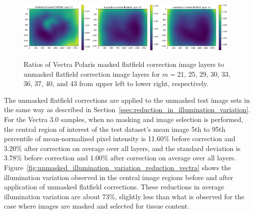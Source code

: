 \documentclass[letterpaper,11pt]{article}
\newcommand{\reffig}[1]{Figure~\ref{#1}}
\newcommand{\refsec}[1]{Section~\ref{#1}}
\begin{document}
\begin{figure}[!ht]
\includegraphics[width=0.32\textwidth]{images/results/masked_over_unmasked_flatfield_image_layers_polaris/masked_over_unmasked_flatfield_layer_37}
\includegraphics[width=0.32\textwidth]{images/results/masked_over_unmasked_flatfield_image_layers_polaris/masked_over_unmasked_flatfield_layer_40}
\includegraphics[width=0.32\textwidth]{images/results/masked_over_unmasked_flatfield_image_layers_polaris/masked_over_unmasked_flatfield_layer_43}
\caption{\footnotesize Ratios of Vectra Polaris masked flatfield correction image layers to unmasked flatfield correction image layers for $m=$21, 25, 29, 30, 33, 36, 37, 40, and 43 from upper left to lower right, respectively.}
\label{fig:masked_over_unmasked_flatfield_image_layers_polaris_2}
\end{figure}

The unmasked flatfield corrections are applied to the unmasked test image sets in the same way as described in \refsec{ssec:reduction_in_illumination_variation}. For the Vectra 3.0 samples, when no masking and image selection is performed, the central region of interest of the test dataset's mean image 5th to 95th percentile of mean-normalized pixel intensity is 11.60\% before correction and 3.20\% after correction on average over all layers, and the standard deviation is 3.78\% before correction and 1.00\% after correction on average over all layers. \reffig{fig:unmasked_illumination_variation_reduction_vectra} shows the illumination variation observed in the central image regions before and after application of unmasked flatfield corrections. These reductions in average illumination variation are about 73\%, slightly less than what is observed for the case where images are masked and selected for tissue content. 
\end{document}
